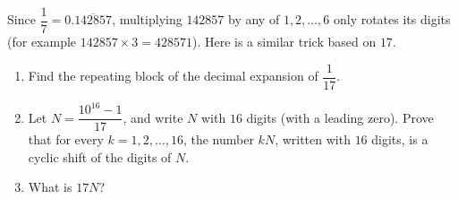 Since $\dfrac{1}{7}=0.\overline{142857}$, multiplying $142857$ by any of $1,2,\dots,6$ only rotates its digits (for example $142857\times3=428571$). Here is a similar trick based on $17$.
\begin{enumerate}
\item[(a)] Find the repeating block of the decimal expansion of $\dfrac{1}{17}$.
\item[(b)] Let $N=\dfrac{10^{16}-1}{17}$, and write $N$ with $16$ digits (with a leading zero). Prove that for every $k=1,2,\dots,16$, the number $kN$, written with $16$ digits, is a cyclic shift of the digits of $N$.
\item[(c)] What is $17N$?
\end{enumerate}
